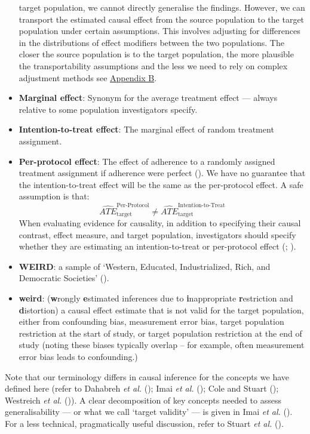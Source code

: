 \documentclass[
  single column]{article}
\begin{document}
\begin{itemize}
  target population, we cannot directly generalise the findings.
  However, we can transport the estimated causal effect from the source
  population to the target population under certain assumptions. This
  involves adjusting for differences in the distributions of effect
  modifiers between the two populations. The closer the source
  population is to the target population, the more plausible the
  transportability assumptions and the less we need to rely on complex
  adjustment methods see \hyperref[id-app-b]{Appendix B}.
\item
  \textbf{Marginal effect}: Synonym for the average treatment effect ---
  always relative to some population investigators specify.
\item
  \textbf{Intention-to-treat effect}: The marginal effect of random
  treatment assignment.
\item
  \textbf{Per-protocol effect}: The effect of adherence to a randomly
  assigned treatment assignment if adherence were perfect
  (). We have no
  guarantee that the intention-to-treat effect will be the same as the
  per-protocol effect. A safe assumption is that: \[
  \widehat{ATE}_{\text{target}}^{\text{Per-Protocol}} \ne \widehat{ATE}_{\text{target}}^{\text{Intention-to-Treat}}
  \] When evaluating evidence for causality, in addition to specifying
  their causal contrast, effect measure, and target population,
  investigators should specify whether they are estimating an
  intention-to-treat or per-protocol effect
  (;
  ).
\item
  \textbf{WEIRD}: a sample of `Western, Educated, Industrialized, Rich,
  and Democratic Societies' ().
\item
  \textbf{weird}: (\textbf{w}rongly \textbf{e}stimated inferences due to
  \textbf{i}nappropriate \textbf{r}estriction and \textbf{d}istortion) a
  causal effect estimate that is not valid for the target population,
  either from confounding bias, measurement error bias, target
  population restriction at the start of study, or target population
  restriction at the end of study (noting these biases typically overlap
  -- for example, often measurement error bias leads to confounding.)
\end{itemize}

Note that our terminology differs in causal inference for the concepts
we have defined here (refer to Dahabreh \emph{et al.}
(); Imai \emph{et al.}
(); Cole and Stuart
(); Westreich \emph{et al.}
()). A clear
decomposition of key concepts needed to assess generalisability --- or
what we call `target validity' --- is given in Imai \emph{et al.}
(). For a less technical,
pragmatically useful discussion, refer to Stuart \emph{et al.}
().
\end{document}
